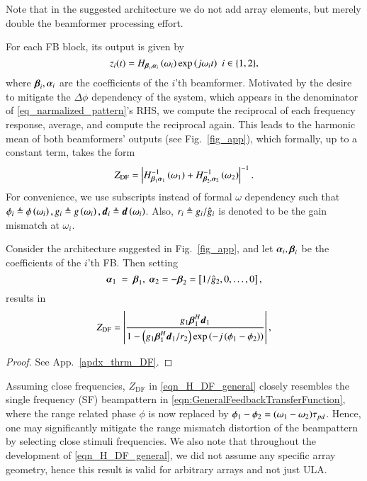 Note that in the suggested architecture we do not add array elements, but merely double the beamformer processing effort. 
\par For each FB block, its output is given by
\[
z_{i}(t)=H_{\vBetaI{i},\vAlphaI{i}}\rBrace{\omega_{i}}\exp{\rBrace{j\omega_{i}t}}\ \ {i\in\cBrace{1,2}},
\]
where $\boldsymbol{\beta}_{i},\boldsymbol{\alpha}_{i}$ are the coefficients of the $i$'th beamformer.
Motivated by the desire to mitigate the $\Delta\phi$ dependency of the system, which appears in the denominator of \eqref{eq_narmalized_pattern}'s RHS, we compute the reciprocal of each frequency response, average, and compute the reciprocal again. This leads to the harmonic mean of both beamformers' outputs (see Fig.~\ref{fig_app}), which formally, up to a constant term, takes the form
\begin{equation}
    \label{eqn_HDF_def}
    Z_{\text{DF}} = \left\vert H^{-1}_{\boldsymbol{\beta}_{1}\boldsymbol{\alpha}_{1}}\left({\omega_{1}}\right)+H^{-1}_{\boldsymbol{\beta}_{2},\boldsymbol{\alpha}_{2}}\left({\omega_{2}}\right)\right\vert^{-1}.
\end{equation}
For convenience, we use subscripts instead of formal $\omega$ dependency such that $\phi_{i}\triangleq\phi\left({\omega_{i}}\right), g_{i}\triangleq{}g\left({\omega_{i}}\right), \boldsymbol{d}_{i}\triangleq\boldsymbol{d}\left({\omega_{i}}\right)$.
Also, $r_i\triangleq{}g_{i}/\hat{g}_{i}$ is denoted to be the gain mismatch at $\omega_i$.

\begin{theorem}
\label{thrm_DF}
Consider the architecture suggested in Fig.~\ref{fig_app}, and let \textit{$\boldsymbol{\alpha}_{i},\boldsymbol{\beta}_{i}$} be the coefficients of the $i$'th FB. Then setting 
\begin{equation}\label{eqn_simpleBeta}
    \vAlphaI{1}~=~\vBetaI{1},\ \vAlphaI{2}=-\vBetaI{2}=\vBrace{1/\gIHat{2},0,\hdots,0},
\end{equation}
results in 
\begin{equation}
    Z_{\text{DF}} = \left|{\frac{g_{1}\boldsymbol{\beta}^{H}_{1}\boldsymbol{d}_{1}}{1-
    \left({g_{1}\boldsymbol{\beta}^{H}_{1}\boldsymbol{d}_{1}/r_{2}}\right)\exp\left({-j\left({\phi_{1}-\phi_{2}}\right)}\right)
    }}\right|,
    \label{eqn_H_DF_general}
\end{equation}
\end{theorem}

\begin{proof}
See App.~\ref{apdx_thrm_DF}. 
\end{proof}
\par Assuming close frequencies, $Z_{\text{DF}}$ in  \eqref{eqn_H_DF_general} closely resembles the single frequency (SF) beampattern in  \eqref{eqn:GeneralFeedbackTransferFunction}, where the range related phase $\phi$ is now replaced by  $\phi_{1}-\phi_{2}=(\omega_1-\omega_2)\tau_{pd}$. 
Hence, one may significantly mitigate the range mismatch distortion of the beampattern by selecting close stimuli frequencies.
We also note that throughout the development of \eqref{eqn_H_DF_general}, we did not assume any specific array geometry, hence this result is valid for arbitrary arrays and not just ULA.
